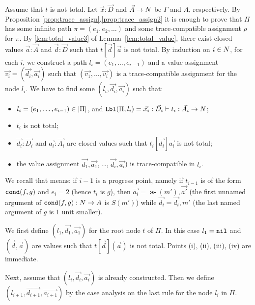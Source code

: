 \documentclass{article}
\newenvironment{proof}[1][Proof]{\begin{trivlist}
\item[\hskip \labelsep {\bfseries #1}]}{\end{trivlist}}
\begin{document}
\begin{proof}
  Assume that $t$ is not total. 
  Let $\vec{x}:\vec{D}$ and $\vec{A}\rightarrow{N}$ be $\Gamma$ and $A$, respectively.
  By Proposition \ref{prop:trace_assign}.\ref{prop:trace_assign2} it is enough to prove that
  $\Pi$ has some infinite path $\pi=(e_1, e_2, \ldots)$ 
  and some trace-compatible assignment $\rho$ for $\pi$.
  By \ref{lem:total_value3} of Lemma~\ref{lem:total_value},
  there exist closed values $\vec{a}:\vec{A}$ and $\vec{d}:\vec{D}$ such that
  $t[\vec{d}]\vec{a}$ is not total. 
  By induction on $i \in {N}$, for each $i$, we construct a path $l_i = (e_1,\ldots,e_{i-1})$
  and a value assignment $\vec{v_i} = (\vec{d_i},\vec{a_i})$ such that
  $(\vec{v_1},\ldots,\vec{v_i})$ is a trace-compatible assignment for the node $l_i$. 
  We have to find some $(l_i,\vec{d_i},\vec{a_i})$ such that:
  \begin{itemize}
  \item[(i)]
   $l_i = (e_1, \ldots, e_{i-1}) \in {|\Pi|}$, 
     and ${\tt Lbl}(\Pi,l_i) = \vec{x_{i}}:\vec{D_{i}}\vdash t_{i} : \vec{A_{i}}\rightarrow{N}$; 
  \item[(ii)]
    $t_{i}$ is not total;
  \item[(iii)]
    $\vec{d_{i}}:\vec{D_i}$ and $\vec{a_i}:\vec{A_i}$ are closed values
    such that $t_{i}[\vec{d_i}]\vec{a_i}$ is not total;
  \item[(iv)]
    the value assignment 
    $\vec{d_1},\vec{a_1}$, \ldots, $\vec{d_i},\vec{a_i}$) is trace-compatible in $l_i$.
  \end{itemize}
  
 We recall that  means: 
 if $i-1$ is a progress point, namely if $t_{i-1}$ is of the form ${\tt cond}(f,g)$ and $e_i=2$ 
    (hence $t_i$ is $g$),
    then $\vec{a_i} = \Succ(m'),\vec{a'}$ 
     (the first unnamed argument of ${\tt cond}(f,g):{N} \rightarrow A$ is $S(m')$)
     while $\vec{d_i} = \vec{d_i},m'$ 
     (the last named argument of $g$ is $1$ unit smaller).

  We first define $(l_1,\vec{d_1},\vec{a_1})$ for the root node $t$ of $\Pi$.
  In this case $l_1 = {\tt nil}$ 
   and $(\vec{d},\vec{a})$ are values such that $t[\vec{d}](\vec{a})$ is not total.
  Points (i), (ii), (iii), (iv) are immediate.

  Next, assume that $(l_i,\vec{d_i},\vec{a_i})$ is already constructed.
  Then we define $(l_{i+1},\vec{d_{i+1}},\vec{a_{i+1}})$ by the case analysis on
  the last rule for the node $l_i$ in $\Pi$. 


\end{proof}
\end{document}
